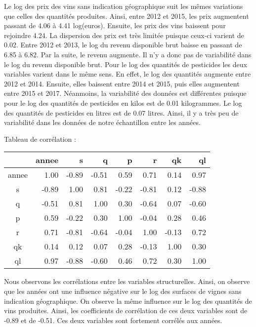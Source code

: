 \documentclass[11pt, a4paper]{article}
\begin{document}
Le log des prix des vins sans indication géographique suit les mêmes variations que celles des quantités produites. 
Ainsi, entre 2012 et 2015, les prix augmentent passant de 4.06 à 4.41 log(euros). 
Ensuite, les prix des vins baissent pour rejoindre 4.24. La dispersion des prix est très limitée puisque ceux-ci varient de 0.02. 
Entre 2012 et 2013, le log du revenu disponible brut baisse en passant de 6.85 à 6.82. 
Par la suite, le revenu augmente. 
Il n’y a donc pas de variabilité dans le log du revenu disponible brut. 
Pour le log des quantités de pesticides les deux variables varient dans le même sens. 
En effet, le log des quantités augmente entre 2012 et 2014. 
Ensuite, elles baissent entre 2014 et 2015, puis elles augmentent entre 2015 et 2017. 
Néanmoins, la variabilité des données est différentes puisque pour le log des quantités de pesticides en kilos est de 0.01 kilogrammes. 
Le log des quantités de pesticides en litres est de 0.07 litres. 
Ainsi, il y a très peu de variabilité dans les données de notre échantillon entre les années.
\par
Tableau de corrélation :
\FloatBarrier
\begin{center}
\begin{tabular}{c|rrrrrrr}
  \hline
  & annee & s & q & p & r & qk & ql \\ 
  \hline
  annee & 1.00 & -0.89 & -0.51 & 0.59 & 0.71 & 0.14 & 0.97 \\ 
  s & -0.89 & 1.00 & 0.81 & -0.22 & -0.81 & 0.12 & -0.88 \\ 
  q & -0.51 & 0.81 & 1.00 & 0.30 & -0.64 & 0.07 & -0.60 \\ 
  p & 0.59 & -0.22 & 0.30 & 1.00 & -0.04 & 0.28 & 0.46 \\ 
  r & 0.71 & -0.81 & -0.64 & -0.04 & 1.00 & -0.13 & 0.72 \\ 
  qk & 0.14 & 0.12 & 0.07 & 0.28 & -0.13 & 1.00 & 0.30 \\ 
  ql & 0.97 & -0.88 & -0.60 & 0.46 & 0.72 & 0.30 & 1.00 \\ 
   \hline
\end{tabular}
\end{center}
\FloatBarrier
Nous observons les corrélations entre les variables structurelles. 
Ainsi, on observe que les années ont une influence négative sur le log des surfaces de vignes sans indication géographique. 
On observe la même influence sur le log des quantités de vins produites. 
Ainsi, les coefficients de corrélation de ces deux variables sont de -0.89 et de -0.51. 
Ces deux variables sont fortement corrélés aux années. 
\end{document}
